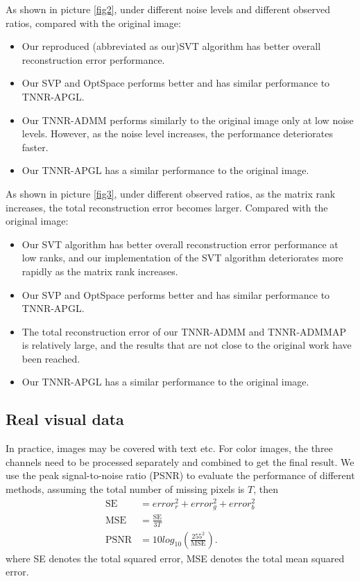 \documentclass{article}
\begin{document}
{As shown in picture \ref{fig2}, under different noise levels and different observed ratios, compared with the original image:
\begin{itemize}
	\item Our reproduced (abbreviated as our)SVT algorithm has better overall reconstruction error performance.
	
	\item Our SVP and OptSpace performs better and has similar performance to TNNR-APGL.
	
	\item Our TNNR-ADMM performs similarly to the original image only at low noise levels. However, as the noise level increases, the performance deteriorates faster.
	
	\item Our TNNR-APGL has a similar performance to the original image.
\end{itemize}

As shown in picture \ref{fig3}, under different observed ratios, as the
matrix rank increases, the total reconstruction error becomes larger. Compared with the original image:
\begin{itemize}
	\item Our SVT algorithm has better overall reconstruction error performance at low ranks, and our implementation of the SVT algorithm deteriorates more rapidly as the matrix rank increases.
	
	\item Our SVP and OptSpace performs better and has similar performance to TNNR-APGL.
	
	\item The total reconstruction error of our TNNR-ADMM and TNNR-ADMMAP is relatively large, and the results that are not close to the original work have been reached.
	
	\item Our TNNR-APGL has a similar performance to the original image.
\end{itemize}


\subsection{Real visual data}
In practice, images may be covered with text etc. For color images, the three channels need to be processed separately and combined to get the final result. We use the peak signal-to-noise ratio (PSNR) to evaluate the performance of different methods, assuming the total number of missing pixels is $T$, then
\begin{align*}
	\text{SE} & = error_r^2 + error_g^2 + error_b^2 \\
	\text{MSE} & = \frac{\text{SE}}{3T} \\
	\text{PSNR} & = 10log_{10}(\frac{255^2}{\text{MSE}}).
\end{align*}
where SE denotes the total squared error, MSE denotes the total mean squared error.

}
\end{document}
